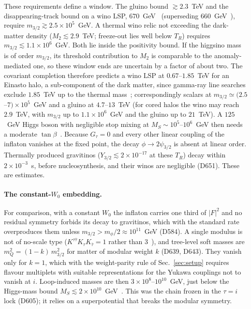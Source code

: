 \documentclass[aps,prd,twocolumn,superscriptaddress,nofootinbib,floatfix]{revtex4-2}
\begin{document}
These requirements define a window. The gluino bound $\gtrsim2.3$~TeV and the disappearing-track bound on a wino LSP, $670$~GeV~\cite{arXiv_2603_08315} (superseding $660$~GeV~\cite{arXiv_2201_02472}), require $m_{3/2}\gtrsim2.5\times10^5$~GeV. A thermal wino relic not exceeding the dark-matter density ($M_2\lesssim2.9$~TeV; freeze-out lies well below $T_R$) requires $m_{3/2}\lesssim1.1\times10^6$~GeV. Both lie inside the positivity bound. If the higgsino mass is of order $m_{3/2}$, its threshold contribution to $M_2$ is comparable to the anomaly-mediated one, so these window ends are uncertain by a factor of about two. The covariant completion therefore predicts a wino LSP at $0.67$--$1.85$~TeV for an Einasto halo, a sub-component of the dark matter, since gamma-ray line searches exclude $1.85$~TeV up to the thermal mass~\cite{arXiv_2507_15934}; correspondingly scalars at $m_{3/2}\simeq(2.5$--$7)\times10^5$~GeV and a gluino at $4.7$--$13$~TeV (for cored halos the wino may reach $2.9$~TeV, with $m_{3/2}$ up to $1.1\times10^6$~GeV and the gluino up to $21$~TeV). A $125$~GeV Higgs boson with negligible stop mixing at $M_S\sim10^5$--$10^6$~GeV then needs a moderate $\tan\beta$~\cite{arXiv_1407_4081}. Because $G_\tau=0$ and every other linear coupling of the inflaton vanishes at the fixed point, the decay $\phi\to2\psi_{3/2}$ is absent at linear order. Thermally produced gravitinos ($Y_{3/2}\lesssim2\times10^{-17}$ at these $T_R$) decay within $2\times10^{-3}$~s, before nucleosynthesis, and their winos are negligible (D651). These are estimates.

\paragraph{The constant-$W_0$ embedding.} For comparison, with a constant $W_0$ the inflaton carries one third of $|F|^2$ and no residual symmetry forbids its decay to gravitinos, which with the standard rate~\cite{arXiv_hep-ph_0611166} overproduces them unless $m_{3/2}>m_\phi/2\approx10^{11}$~GeV (D584). A single modulus is not of no-scale type ($K^{\tau\bar\tau}K_\tau K_{\bar\tau}=1$ rather than $3$~\cite{arXiv_1305_1247}), and tree-level soft masses are $m_Q^2=(1-k)\,m_{3/2}^2$ for matter of modular weight $k$ (D639, D643). They vanish only for $k=1$, which with the weight-parity rule of Sec.~\ref{sec:setup} requires flavour multiplets with suitable representations for the Yukawa couplings not to vanish at $i$. Loop-induced masses are then $3\times10^8$--$10^{10}$~GeV, just below the Higgs-mass bound $M_S\lesssim2\times10^{10}$~GeV~\cite{arXiv_1407_4081}. This was the chain frozen in the $\tau=i$ lock (D605); it relies on a superpotential that breaks the modular symmetry.
\end{document}
